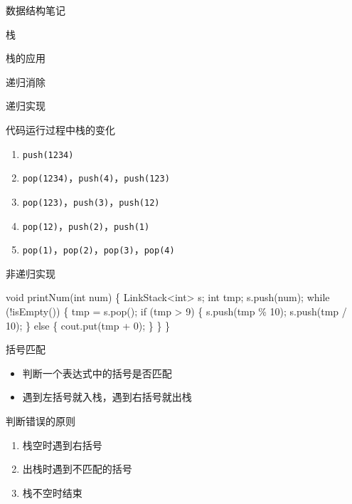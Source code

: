 \documentclass[
  ignorenonframetext,
]{beamer}
\newenvironment{Shaded}{}{}
\newcommand{\NormalTok}[1]{#1}
\providecommand{\tightlist}{%
  \setlength{\itemsep}{0pt}\setlength{\parskip}{0pt}}
\begin{document}
\begin{frame}[fragile]{数据结构笔记}
\begin{block}{栈}
\begin{block}{栈的应用}
\begin{block}{递归消除}
\begin{block}{递归实现}
\begin{block}{代码运行过程中栈的变化}
\protect{}\label{ux4ee3ux7801ux8fd0ux884cux8fc7ux7a0bux4e2dux6808ux7684ux53d8ux5316}
\begin{enumerate}
\tightlist
\item
  \texttt{push(1234)}
\item
  \texttt{pop(1234)}，\texttt{push(4)}，\texttt{push(123)}
\item
  \texttt{pop(123)}，\texttt{push(3)}，\texttt{push(12)}
\item
  \texttt{pop(12)}，\texttt{push(2)}，\texttt{push(1)}
\item
  \texttt{pop(1)}，\texttt{pop(2)}，\texttt{pop(3)}，\texttt{pop(4)}
\end{enumerate}
\end{block}
\end{block}

\begin{block}{非递归实现}
\protect{}\label{ux975eux9012ux5f52ux5b9eux73b0}
\begin{Shaded}
\begin{Highlighting}[]
\NormalTok{void printNum(int num)}
\NormalTok{\{}
\NormalTok{  LinkStack\textless{}int\textgreater{} s;}
\NormalTok{  int tmp;}
\NormalTok{  s.push(num);}
\NormalTok{  while (!isEmpty())}
\NormalTok{  \{}
\NormalTok{    tmp = s.pop();}
\NormalTok{    if (tmp \textgreater{} 9)}
\NormalTok{    \{}
\NormalTok{      s.push(tmp \% 10);}
\NormalTok{      s.push(tmp / 10);}
\NormalTok{    \}}
\NormalTok{    else}
\NormalTok{    \{}
\NormalTok{      cout.put(tmp + \textquotesingle{}0\textquotesingle{});}
\NormalTok{    \}}
\NormalTok{  \}}
\NormalTok{\}}
\end{Highlighting}
\end{Shaded}
\end{block}
\end{block}
\end{block}

\begin{block}{括号匹配}
\protect{}\label{ux62ecux53f7ux5339ux914d}
\begin{itemize}
\tightlist
\item
  判断一个表达式中的括号是否匹配
\item
  遇到左括号就入栈，遇到右括号就出栈
\end{itemize}

判断错误的原则

\begin{enumerate}
\tightlist
\item
  栈空时遇到右括号
\item
  出栈时遇到不匹配的括号
\item
  栈不空时结束
\end{enumerate}
\end{block}


\end{block}
\end{frame}
\end{document}
